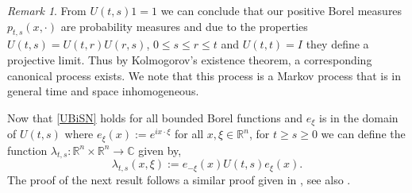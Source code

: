 \documentclass[a4paper, 12pt]{report}
\theoremstyle{cor}
\theoremstyle{remark}
\newtheorem{remark}[theorem]{Remark}
\theoremstyle{definition}
\begin{document}
\begin{remark}
From $U(t, s)1 = 1$ we can conclude that our positive Borel measures $p_{t, s}(x, \cdot)$ are probability measures and due to the properties $U(t, s) = U(t, r)U(r, s)$, $0 \le s \le r \le t$ and $U(t, t) = I$ they define a projective limit.  Thus by Kolmogorov's existence theorem, a corresponding canonical process exists.  We note that this process is a Markov process that is in general time and space inhomogeneous.
\end{remark}

Now that \eqref{UBiSN} holds for all bounded Borel functions and $e_\xi$ is in the domain of $U(t, s)$ where $e_\xi(x) := e^{ix\cdot\xi}$ for all $x, \xi \in \mathbb{R}^n$, for $t \ge s \ge 0$ we can define the function $\lambda_{t, s} : \mathbb{R}^n \times \mathbb{R}^n \to \mathbb{C}$ given by,
\begin{equation}
\lambda_{t, s}(x, \xi) := e_{-\xi}(x)U(t, s)e_\xi(x).
\end{equation}
The proof of the next result follows a similar proof given in \cite{SymbolPaper}, see also \cite{Conservative}.
\end{document}
